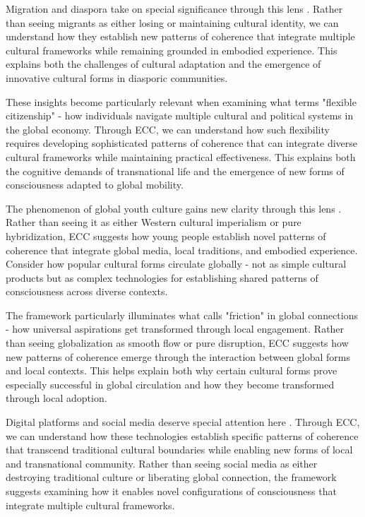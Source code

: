 Migration and diaspora take on special significance through this lens \cite{schiller1992transnational}. Rather than seeing migrants as either losing or maintaining cultural identity, we can understand how they establish new patterns of coherence that integrate multiple cultural frameworks while remaining grounded in embodied experience. This explains both the challenges of cultural adaptation and the emergence of innovative cultural forms in diasporic communities.

These insights become particularly relevant when examining what \cite{ong1999flexible} terms "flexible citizenship" - how individuals navigate multiple cultural and political systems in the global economy. Through ECC, we can understand how such flexibility requires developing sophisticated patterns of coherence that can integrate diverse cultural frameworks while maintaining practical effectiveness. This explains both the cognitive demands of transnational life and the emergence of new forms of consciousness adapted to global mobility.

The phenomenon of global youth culture gains new clarity through this lens \cite{iwabuchi2002recentering}. Rather than seeing it as either Western cultural imperialism or pure hybridization, ECC suggests how young people establish novel patterns of coherence that integrate global media, local traditions, and embodied experience. Consider how popular cultural forms circulate globally - not as simple cultural products but as complex technologies for establishing shared patterns of consciousness across diverse contexts.

The framework particularly illuminates what \cite{tsing2005friction} calls "friction" in global connections - how universal aspirations get transformed through local engagement. Rather than seeing globalization as smooth flow or pure disruption, ECC suggests how new patterns of coherence emerge through the interaction between global forms and local contexts. This helps explain both why certain cultural forms prove especially successful in global circulation and how they become transformed through local adoption.

Digital platforms and social media deserve special attention here \cite{castells2010rise}. Through ECC, we can understand how these technologies establish specific patterns of coherence that transcend traditional cultural boundaries while enabling new forms of local and transnational community. Rather than seeing social media as either destroying traditional culture or liberating global connection, the framework suggests examining how it enables novel configurations of consciousness that integrate multiple cultural frameworks.

